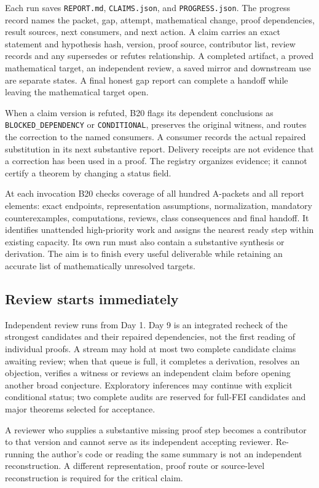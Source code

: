 \documentclass[11pt]{article}
\begin{document}
Each run saves \texttt{REPORT.md}, \texttt{CLAIMS.json}, and \texttt{PROGRESS.json}. The progress record names the packet, gap, attempt, mathematical change, proof dependencies, result sources, next consumers, and next action. A claim carries an exact statement and hypothesis hash, version, proof source, contributor list, review records and any supersedes or refutes relationship. A completed artifact, a proved mathematical target, an independent review, a saved mirror and downstream use are separate states. A final honest gap report can complete a handoff while leaving the mathematical target open.

When a claim version is refuted, B20 flags its dependent conclusions as \texttt{BLOCKED\_DEPENDENCY} or \texttt{CONDITIONAL}, preserves the original witness, and routes the correction to the named consumers. A consumer records the actual repaired substitution in its next substantive report. Delivery receipts are not evidence that a correction has been used in a proof. The registry organizes evidence; it cannot certify a theorem by changing a status field.

At each invocation B20 checks coverage of all hundred A-packets and all report elements: exact endpoints, representation assumptions, normalization, mandatory counterexamples, computations, reviews, class consequences and final handoff. It identifies unattended high-priority work and assigns the nearest ready step within existing capacity. Its own run must also contain a substantive synthesis or derivation. The aim is to finish every useful deliverable while retaining an accurate list of mathematically unresolved targets.

\subsection{Review starts immediately}

Independent review runs from Day 1. Day 9 is an integrated recheck of the strongest candidates and their repaired dependencies, not the first reading of individual proofs. A stream may hold at most two complete candidate claims awaiting review; when that queue is full, it completes a derivation, resolves an objection, verifies a witness or reviews an independent claim before opening another broad conjecture. Exploratory inferences may continue with explicit conditional status; two complete audits are reserved for full-FEI candidates and major theorems selected for acceptance.

A reviewer who supplies a substantive missing proof step becomes a contributor to that version and cannot serve as its independent accepting reviewer. Re-running the author's code or reading the same summary is not an independent reconstruction. A different representation, proof route or source-level reconstruction is required for the critical claim.
\end{document}
